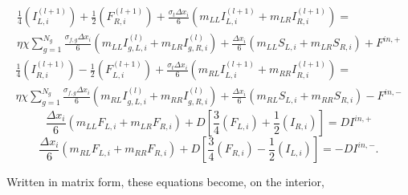 \documentclass{template}
\begin{document}
\begin{multline}
    \frac{1}{4} \left(I_{L, i}^{(l+1)}\right) + \frac{1}{2}\left(F_{R, i}^{(l+1)}  \right) + \frac{\sigma_t \Delta x_i}{6} \left( m_{LL} I_{L, i}^{(l+1)} + m_{LR}I_{R, i}^{(l+1)}\right) =\\
    \eta \chi \sum_{g=1}^{N_g} \frac{\sigma_{f, g} \Delta x_i}{6} \left(m_{LL} I_{g, L, i}^{(l)} + m_{LR} I_{g, R, i}^{(l)} \right) + \frac{\Delta x_i}{6} \left(m_{LL}S_{L, i} + m_{LR}S_{R, i} \right) + F^{in, +}
\end{multline}
\begin{multline}
    \frac{1}{4} \left(I_{R, i}^{(l+1)}  \right) - \frac{1}{2}\left(F_{L, i}^{(l+1)} \right) + \frac{\sigma_t \Delta x_i}{6} \left( m_{RL} I_{L, i}^{(l+1)} + m_{RR}I_{R, i}^{(l+1)}\right) =\\
    \eta \chi \sum_{g=1}^{N_g} \frac{\sigma_{f, g} \Delta x_i}{6} \left(m_{RL} I_{g, L, i}^{(l)} + m_{RR} I_{g, R, i}^{(l)} \right) + \frac{\Delta x_i}{6} \left(m_{RL}S_{L, i} + m_{RR}S_{R, i} \right) - F^{in, -}
\end{multline}
\begin{equation}
    \frac{\Delta x_i}{6}\left( m_{LL} F_{L, i} + m_{LR}F_{R, i} \right) + D \left[ \frac{3}{4}\left(F_{L, i}  \right)  + \frac{1}{2}\left(I_{R, i}  \right) \right] = DI^{in, +}
\end{equation}
\begin{equation}
    \frac{\Delta x_i}{6}\left( m_{RL} F_{L, i} + m_{RR}F_{R, i} \right) + D \left[ \frac{3}{4}\left(F_{R, i} \right)  - \frac{1}{2}\left(  I_{L, i} \right) \right] = -DI^{in, -}.
\end{equation}

Written in matrix form, these equations become, on the interior,
\end{document}
